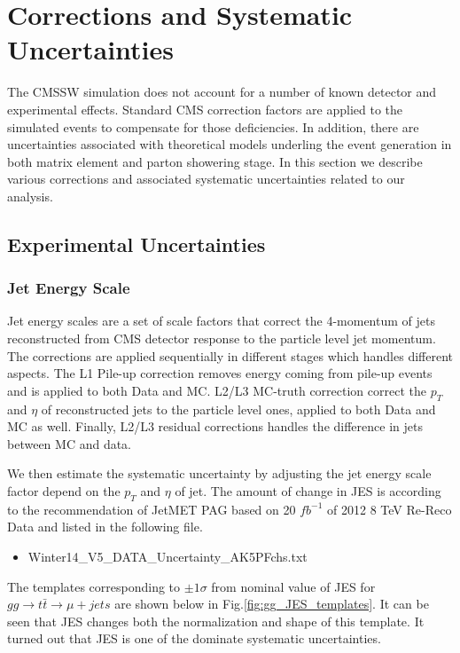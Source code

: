 \documentclass{cmspaperpdf}
\begin{document}
\clearpage
\section{Corrections and Systematic Uncertainties}
\label{sec:corrections}

The CMSSW simulation does not account for a number of known detector and experimental effects.  Standard CMS correction factors are applied to the simulated events to compensate for those deficiencies. In addition, there are uncertainties associated with theoretical models underling the event generation in both matrix element and parton showering stage. In this section we describe various corrections and associated systematic uncertainties related to our analysis.

\subsection{Experimental Uncertainties}

\subsubsection{Jet Energy Scale}
Jet energy scales are a set of scale factors that correct the 4-momentum of jets reconstructed from CMS detector response to the particle level jet momentum. The corrections are applied sequentially in different stages which handles different aspects. The L1 Pile-up correction removes energy coming from pile-up events and is applied to both Data and MC. L2/L3 MC-truth correction correct the $p_T$ and $\eta$ of reconstructed jets to the particle level ones, applied to both Data and MC as well. Finally, L2/L3 residual corrections handles the difference in jets between MC and data.  

We then estimate the systematic uncertainty by adjusting the jet energy scale factor depend on the $p_T$ and $\eta$ of jet. The amount of change in JES is according to the recommendation of JetMET PAG based on 20 $fb^{-1}$ of 2012 8 TeV Re-Reco Data \cite{JES_uncertainty} and listed in the following file.
\begin{itemize}
\item Winter14\_V5\_DATA\_Uncertainty\_AK5PFchs.txt
\end{itemize}

The templates corresponding to $\pm 1\sigma$ from nominal value of JES for $gg\rightarrow t\bar{t}\rightarrow \mu+jets$ are shown below in Fig.\ref{fig:gg_JES_templates}. It can be seen that JES changes both the normalization and shape of this template. It turned out that JES is one of the dominate systematic uncertainties.
\end{document}
